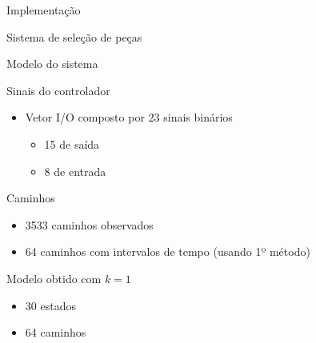 \documentclass[xcolor=x11names,compress,framenumber]{beamer}
\renewcommand{\(}{\begin{columns}}
\renewcommand{\)}{\end{columns}}
\newcommand{\<}[1]{\begin{column}{#1}}
\renewcommand{\>}{\end{column}}
\begin{document}
\begin{frame}{Implementação}
\begin{block}{Sistema de seleção de peças}
	\begin{center}
	\end{center}
	\begin{center}
	\end{center}
\end{block}

\end{frame}

\begin{frame}{Modelo do sistema}
	\begin{block}{Sinais do controlador}
		\begin{itemize}
			\item Vetor I/O composto por 23 sinais binários
			\begin{itemize}
				\item 15 de saída
				\item 8 de entrada
			\end{itemize}
		\end{itemize}
	\end{block}
	\begin{block}{Caminhos}
		\begin{itemize}
			\item 3533 caminhos observados
			\item 64 caminhos com intervalos de tempo (usando 1º método)
		\end{itemize}
	\end{block}
	\begin{block}{Modelo obtido com $ k = 1 $}
		\begin{itemize}
		\item 30 estados
		\item 64 caminhos
		\end{itemize}
	\end{block}
\end{frame}
\end{document}

